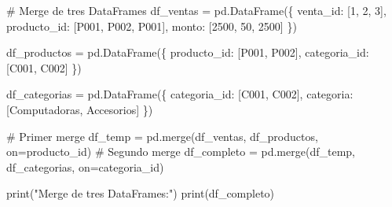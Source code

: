 \documentclass[
  doc,
  floatsintext,
  longtable,
  a4paper,
  nolmodern,
  notxfonts,
  notimes,
  12pt,
  colorlinks=true,linkcolor=blue,citecolor=blue,urlcolor=blue]{apa7}
\newenvironment{Shaded}{\begin{snugshade}}{\end{snugshade}}
\newcommand{\BuiltInTok}[1]{\textcolor[rgb]{0.00,0.23,0.31}{#1}}
\newcommand{\CommentTok}[1]{\textcolor[rgb]{0.37,0.37,0.37}{#1}}
\newcommand{\DecValTok}[1]{\textcolor[rgb]{0.68,0.00,0.00}{#1}}
\newcommand{\NormalTok}[1]{\textcolor[rgb]{0.00,0.23,0.31}{#1}}
\newcommand{\OperatorTok}[1]{\textcolor[rgb]{0.37,0.37,0.37}{#1}}
\newcommand{\StringTok}[1]{\textcolor[rgb]{0.13,0.47,0.30}{#1}}
\begin{document}
\begin{Shaded}
\begin{Highlighting}[]
\CommentTok{\# Merge de tres DataFrames}
\NormalTok{df\_ventas }\OperatorTok{=}\NormalTok{ pd.DataFrame(\{}
    \StringTok{\textquotesingle{}venta\_id\textquotesingle{}}\NormalTok{: [}\DecValTok{1}\NormalTok{, }\DecValTok{2}\NormalTok{, }\DecValTok{3}\NormalTok{],}
    \StringTok{\textquotesingle{}producto\_id\textquotesingle{}}\NormalTok{: [}\StringTok{\textquotesingle{}P001\textquotesingle{}}\NormalTok{, }\StringTok{\textquotesingle{}P002\textquotesingle{}}\NormalTok{, }\StringTok{\textquotesingle{}P001\textquotesingle{}}\NormalTok{],}
    \StringTok{\textquotesingle{}monto\textquotesingle{}}\NormalTok{: [}\DecValTok{2500}\NormalTok{, }\DecValTok{50}\NormalTok{, }\DecValTok{2500}\NormalTok{]}
\NormalTok{\})}

\NormalTok{df\_productos }\OperatorTok{=}\NormalTok{ pd.DataFrame(\{}
    \StringTok{\textquotesingle{}producto\_id\textquotesingle{}}\NormalTok{: [}\StringTok{\textquotesingle{}P001\textquotesingle{}}\NormalTok{, }\StringTok{\textquotesingle{}P002\textquotesingle{}}\NormalTok{],}
    \StringTok{\textquotesingle{}categoria\_id\textquotesingle{}}\NormalTok{: [}\StringTok{\textquotesingle{}C001\textquotesingle{}}\NormalTok{, }\StringTok{\textquotesingle{}C002\textquotesingle{}}\NormalTok{]}
\NormalTok{\})}

\NormalTok{df\_categorias }\OperatorTok{=}\NormalTok{ pd.DataFrame(\{}
    \StringTok{\textquotesingle{}categoria\_id\textquotesingle{}}\NormalTok{: [}\StringTok{\textquotesingle{}C001\textquotesingle{}}\NormalTok{, }\StringTok{\textquotesingle{}C002\textquotesingle{}}\NormalTok{],}
    \StringTok{\textquotesingle{}categoria\textquotesingle{}}\NormalTok{: [}\StringTok{\textquotesingle{}Computadoras\textquotesingle{}}\NormalTok{, }\StringTok{\textquotesingle{}Accesorios\textquotesingle{}}\NormalTok{]}
\NormalTok{\})}

\CommentTok{\# Primer merge}
\NormalTok{df\_temp }\OperatorTok{=}\NormalTok{ pd.merge(df\_ventas, df\_productos, on}\OperatorTok{=}\StringTok{\textquotesingle{}producto\_id\textquotesingle{}}\NormalTok{)}
\CommentTok{\# Segundo merge}
\NormalTok{df\_completo }\OperatorTok{=}\NormalTok{ pd.merge(df\_temp, df\_categorias, on}\OperatorTok{=}\StringTok{\textquotesingle{}categoria\_id\textquotesingle{}}\NormalTok{)}

\BuiltInTok{print}\NormalTok{(}\StringTok{"Merge de tres DataFrames:"}\NormalTok{)}
\BuiltInTok{print}\NormalTok{(df\_completo)}
\end{Highlighting}
\end{Shaded}
\end{document}
